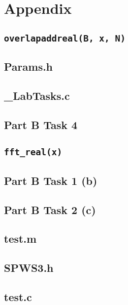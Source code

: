 \documentclass{article}
\begin{document}
\newpage
\section*{Appendix}

\subsection*{\texttt{overlapaddreal(B, x, N)}}\label{overlapaddreal}


\newpage
\subsection*{Params.h}\label{Params_h}


\subsection*{\_LabTasks.c}\label{_LabTasks}


\newpage
\subsection*{Part B Task 4}\label{task4_code}


\subsection*{\texttt{fft\_real(x)}}\label{fft_real}


\subsection*{Part B Task 1 (b)}\label{task1b_code}


\newpage
\subsection*{Part B Task 2 (c)}\label{task2c_code}


\subsection*{test.m}\label{test_m}


\subsection*{SPWS3.h}\label{SPWS3_h}


\subsection*{test.c}\label{test_c}


\end{document}
